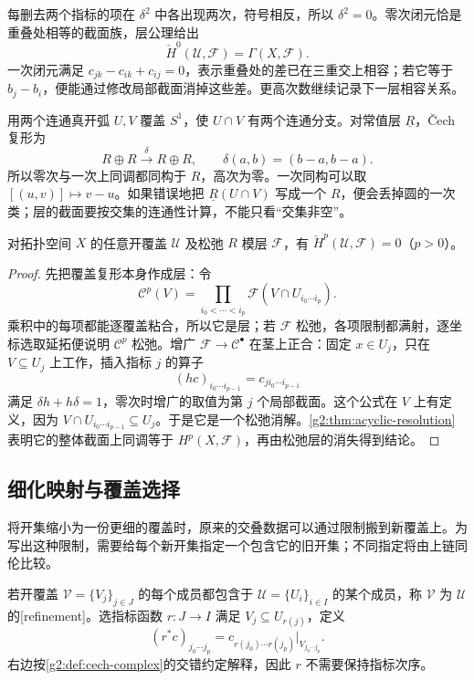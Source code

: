 每删去两个指标的项在 \(\delta^2\) 中各出现两次，符号相反，所以 \(\delta^2=0\)。零次闭元恰是重叠处相等的截面族，层公理给出
\[
	\check H^0(\mathcal U,\mathcal F)=\Gamma(X,\mathcal F).
\]
一次闭元满足 \(c_{jk}-c_{ik}+c_{ij}=0\)，表示重叠处的差已在三重交上相容；若它等于 \(b_j-b_i\)，便能通过修改局部截面消掉这些差。更高次数继续记录下一层相容关系。

\begin{example}\label{g2:exm:cech-circle-two-arcs}
	用两个连通真开弧 \(U,V\) 覆盖 \(S^1\)，使 \(U\cap V\) 有两个连通分支。对常值层 \(\underline R\)，Čech 复形为
	\[
		R\oplus R\xrightarrow{\delta}R\oplus R,\qquad
		\delta(a,b)=(b-a,b-a).
	\]
	所以零次与一次上同调都同构于 \(R\)，高次为零。一次同构可以取 \([(u,v)]\mapsto v-u\)。如果错误地把 \(\underline R(U\cap V)\) 写成一个 \(R\)，便会丢掉圆的一次类；层的截面要按交集的连通性计算，不能只看“交集非空”。
\end{example}

\begin{proposition}\label{g2:prop:cech-flabby}
	对拓扑空间 \(X\) 的任意开覆盖 \(\mathcal U\) 及松弛 \(R\) 模层 \(\mathcal F\)，有 \(\check H^p(\mathcal U,\mathcal F)=0\)（\(p>0\)）。
\end{proposition}
\begin{proof}
	先把覆盖复形本身作成层：令
	\[
		\mathcal C^p(V)=\prod_{i_0<\cdots<i_p}\mathcal F(V\cap U_{i_0\cdots i_p}).
	\]
	乘积中的每项都能逐覆盖粘合，所以它是层；若 \(\mathcal F\) 松弛，各项限制都满射，逐坐标选取延拓便说明 \(\mathcal C^p\) 松弛。增广 \(\mathcal F\to\mathcal C^\bullet\) 在茎上正合：固定 \(x\in U_j\)，只在 \(V\subseteq U_j\) 上工作，插入指标 \(j\) 的算子
	\[
		(hc)_{i_0\cdots i_{p-1}}=c_{j i_0\cdots i_{p-1}}
	\]
	满足 \(\delta h+h\delta=1\)，零次时增广的取值为第 \(j\) 个局部截面。这个公式在 \(V\) 上有定义，因为 \(V\cap U_{i_0\cdots i_{p-1}}\subseteq U_j\)。于是它是一个松弛消解。\cref{g2:thm:acyclic-resolution}表明它的整体截面上同调等于 \(H^p(X,\mathcal F)\)，再由松弛层的消失得到结论。
\end{proof}

\subsection{细化映射与覆盖选择}
\label{g2:subsec:0702:03}
将开集缩小为一份更细的覆盖时，原来的交叠数据可以通过限制搬到新覆盖上。为写出这种限制，需要给每个新开集指定一个包含它的旧开集；不同指定将由上链同伦比较。

\begin{definition}\label{g2:def:cech-refinement}
	若开覆盖 \(\mathcal V=\{V_j\}_{j\in J}\) 的每个成员都包含于 \(\mathcal U=\{U_i\}_{i\in I}\) 的某个成员，称 \(\mathcal V\) 为 \(\mathcal U\) 的[refinement]。选指标函数 \(r:J\to I\) 满足 \(V_j\subseteq U_{r(j)}\)，定义
	\[
		(r^*c)_{j_0\cdots j_p}=c_{r(j_0)\cdots r(j_p)}|_{V_{j_0\cdots j_p}}.
	\]
	右边按\cref{g2:def:cech-complex}的交错约定解释，因此 \(r\) 不需要保持指标次序。
\end{definition}

